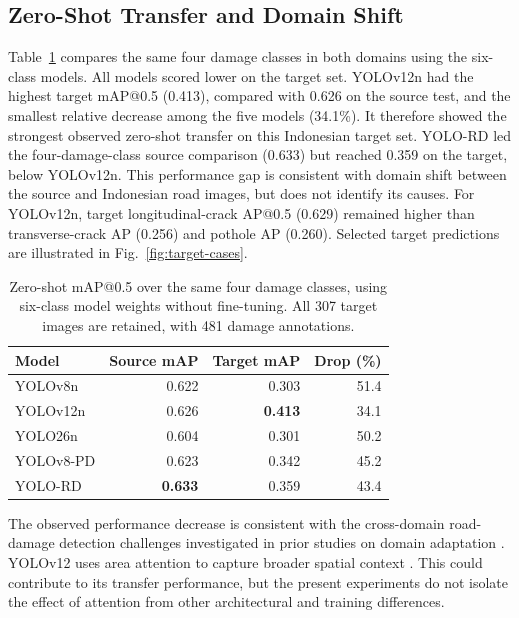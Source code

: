 \documentclass[conference]{IEEEtran}
\newif\ifmaterialanalysis  \materialanalysistrue %
\begin{document}
\subsection{Zero-Shot Transfer and Domain Shift}
Table~\ref{tab:transfer} compares the same four damage classes in both domains using the six-class models. All models scored lower on the target set. YOLOv12n had the highest target mAP@0.5 (0.413), compared with 0.626 on the source test, and the smallest relative decrease among the five models (34.1\%). It therefore showed the strongest observed zero-shot transfer on this Indonesian target set. YOLO-RD led the four-damage-class source comparison (0.633) but reached 0.359 on the target, below YOLOv12n. This performance gap is consistent with domain shift between the source and Indonesian road images, but does not identify its causes. For YOLOv12n, target longitudinal-crack AP@0.5 (0.629) remained higher than transverse-crack AP (0.256) and pothole AP (0.260). \ifmaterialanalysis Selected target predictions are illustrated in Fig.~\ref{fig:target-cases}.\fi

\begin{table}[!htbp]
\centering
\caption{Zero-shot mAP@0.5 over the same four damage classes, using six-class model weights without fine-tuning. All 307 target images are retained, with 481 damage annotations.}
\label{tab:transfer}
\footnotesize
\setlength{\tabcolsep}{5pt}
\begin{tabular}{lrrr}
\toprule
Model & Source mAP & Target mAP & Drop (\%) \\
\midrule
YOLOv8n   & 0.622 & 0.303 & 51.4 \\
YOLOv12n  & 0.626 & \textbf{0.413} & 34.1 \\
YOLO26n   & 0.604 & 0.301 & 50.2 \\
YOLOv8-PD & 0.623 & 0.342 & 45.2 \\
YOLO-RD   & \textbf{0.633} & 0.359 & 43.4 \\
\bottomrule
\end{tabular}
\end{table}

The observed performance decrease is consistent with the cross-domain road-damage detection challenges investigated in prior studies on domain adaptation \cite{lin2023dardd,li2025dife}. YOLOv12 uses area attention to capture broader spatial context \cite{tian2025yolov12_primary}. This could contribute to its transfer performance, but the present experiments do not isolate the effect of attention from other architectural and training differences.
\end{document}

